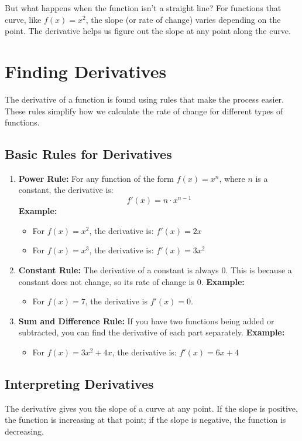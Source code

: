 But what happens when the function isn’t a straight line? For functions that curve, like \( f(x) = x^2 \), the slope (or rate of change) varies depending on the point. The derivative helps us figure out the slope at any point along the curve.

\section{Finding Derivatives}
The derivative of a function is found using rules that make the process easier. These rules simplify how we calculate the rate of change for different types of functions.

\subsection{Basic Rules for Derivatives}
\begin{enumerate}
    \item \textbf{Power Rule:} For any function of the form \( f(x) = x^n \), where \( n \) is a constant, the derivative is:
    \[
    f'(x) = n \cdot x^{n-1}
    \]
    \textbf{Example:}
    \begin{itemize}
        \item For \( f(x) = x^2 \), the derivative is: \( f'(x) = 2x \)
        \item For \( f(x) = x^3 \), the derivative is: \( f'(x) = 3x^2 \)
    \end{itemize}
    \item \textbf{Constant Rule:} The derivative of a constant is always 0. This is because a constant does not change, so its rate of change is 0.
    \textbf{Example:}
    \begin{itemize}
        \item For \( f(x) = 7 \), the derivative is \( f'(x) = 0 \).
    \end{itemize}
    \item \textbf{Sum and Difference Rule:} If you have two functions being added or subtracted, you can find the derivative of each part separately.
    \textbf{Example:}
    \begin{itemize}
        \item For \( f(x) = 3x^2 + 4x \), the derivative is: \( f'(x) = 6x + 4 \)
    \end{itemize}
\end{enumerate}

\subsection{Interpreting Derivatives}
The derivative gives you the slope of a curve at any point. If the slope is positive, the function is increasing at that point; if the slope is negative, the function is decreasing.

